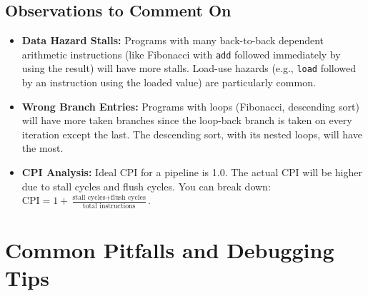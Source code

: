 \documentclass[12pt,a4paper]{article}
\begin{document}
\subsection{Observations to Comment On}

\begin{itemize}
    \item \textbf{Data Hazard Stalls:} Programs with many back-to-back dependent arithmetic instructions (like Fibonacci with \texttt{add} followed immediately by using the result) will have more stalls. Load-use hazards (e.g., \texttt{load} followed by an instruction using the loaded value) are particularly common.
    \item \textbf{Wrong Branch Entries:} Programs with loops (Fibonacci, descending sort) will have more taken branches since the loop-back branch is taken on every iteration except the last. The descending sort, with its nested loops, will have the most.
    \item \textbf{CPI Analysis:} Ideal CPI for a pipeline is 1.0. The actual CPI will be higher due to stall cycles and flush cycles. You can break down: $\text{CPI} = 1 + \frac{\text{stall cycles} + \text{flush cycles}}{\text{total instructions}}$.
\end{itemize}

\section{Common Pitfalls and Debugging Tips}
\end{document}

